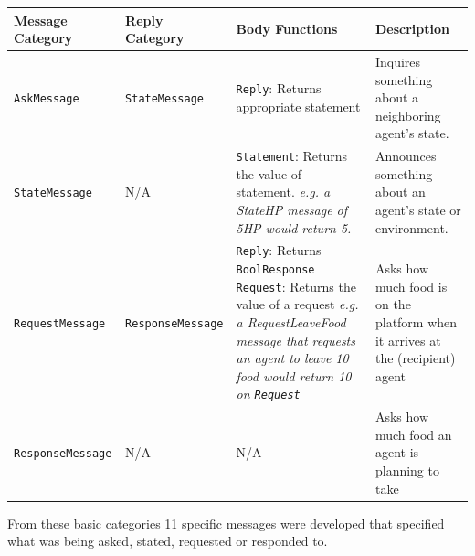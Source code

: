 \begin{center}
\begin{tabular}{p{3cm}p{3cm}p{5cm}p{3.5cm}}
 \hline
 \textbf{Message \newline Category} & \textbf{Reply \newline Category} & \textbf{Body Functions} & \textbf{Description} \\ [0.5ex] 
 \hline\hline
 \texttt{AskMessage} & \texttt{StateMessage} &  \texttt{Reply}: Returns appropriate statement & Inquires something about a neighboring agent's state. \\
 \hline
 \texttt{StateMessage} & N/A & \texttt{Statement}: Returns the value of statement. \textit{e.g. a StateHP message of 5HP would return 5.} & Announces something about an agent's state or environment. \\ 
 \hline
 \texttt{RequestMessage} & \texttt{ResponseMessage} & \texttt{Reply}: Returns \texttt{BoolResponse} \newline \texttt{Request}: Returns the value of a request \textit{e.g. a RequestLeaveFood message that requests an agent to leave 10 food would return 10 on \texttt{Request}} & Asks how much food is on the platform when it arrives at the (recipient) agent \\ 
 \hline
 \texttt{ResponseMessage} & N/A & N/A & Asks how much food an agent is planning to take \\ 
 \hline
\end{tabular}
\end{center}
From these basic categories 11 specific messages were developed that specified what was being asked, stated, requested or responded to.
